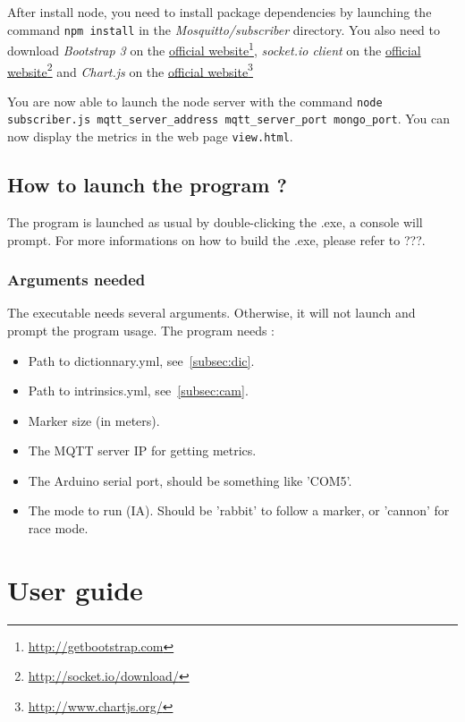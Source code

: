 \documentclass[a4paper,11pt]{report}
\begin{document}
After install node, you need to install package dependencies by launching the
command \texttt{npm install} in the \emph{Mosquitto/subscriber} directory. You
also need to download \emph{Bootstrap 3} on the
\href{http://getbootstrap.com/}{official
website}\footnote{\url{http://getbootstrap.com}}, \emph{socket.io client} on
the \href{http://socket.io/download/}{official
website}\footnote{\url{http://socket.io/download/}} and \emph{Chart.js} on the
\href{http://www.chartjs.org/}{official
website}\footnote{\url{http://www.chartjs.org/}}

You are now able to launch the node server with the command \texttt{node
subscriber.js mqtt\_server\_address mqtt\_server\_port mongo\_port}. You can
now display the metrics in the web page \texttt{view.html}.

\section{How to launch the program ?}

The program is launched as usual by double-clicking the .exe, a console will
prompt.
For more informations on how to build the .exe, please refer to ???.

\subsection{Arguments needed}

The executable needs several arguments. Otherwise, it will not launch and
prompt the program usage.
The program needs :

\begin{itemize}
    \item Path to dictionnary.yml, see~\ref{subsec:dic}.
    \item Path to intrinsics.yml, see~\ref{subsec:cam}.
    \item Marker size (in meters).
    \item The MQTT server IP for getting metrics.
    \item The Arduino serial port, should be something like 'COM5'.
    \item The mode to run (IA). Should be 'rabbit' to follow a marker, or 'cannon' for race mode.
\end{itemize}


\chapter{User guide}
\end{document}
